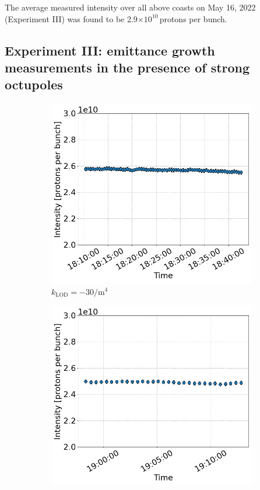  The average measured intensity over all above coasts on May 16, 2022 (Experiment III) was found to be 2.9$\times 10^{10}$\,protons per bunch. 
 
\newpage
 \subsection{Experiment III: emittance growth measurements in the presence of strong octupoles}\label{subsec:2022_exp3_intensity}

 \begin{figure}[htp]
    \centering
    \begin{subfigure}{.4\textwidth}
        \centering
        \includegraphics[width=.95\linewidth]{images/app_e/intensity_cc_md_12Sep22_coast_6.png}  
        \caption{$k_\mathrm{LOD}=-30 \mathrm{/m^{4}}$}
    \end{subfigure}
    \begin{subfigure}{.4\textwidth}
        \centering
        \includegraphics[width=.95\linewidth]{images/app_e/intensity_cc_md_12Sep22_coast_7.png}  

\end{subfigure}
\end{figure}

